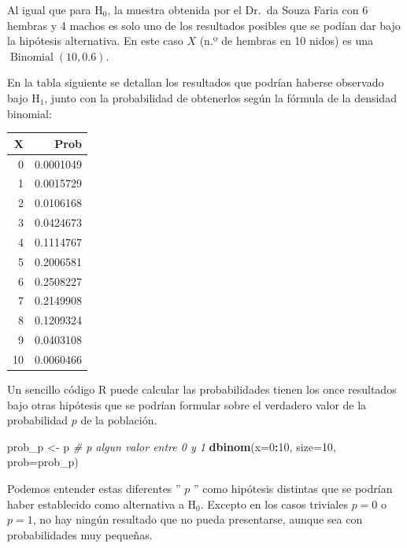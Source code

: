 \documentclass[
]{article}
\newenvironment{Shaded}{\begin{snugshade}}{\end{snugshade}}
\newcommand{\AttributeTok}[1]{\textcolor[rgb]{0.13,0.29,0.53}{#1}}
\newcommand{\CommentTok}[1]{\textcolor[rgb]{0.56,0.35,0.01}{\textit{#1}}}
\newcommand{\DecValTok}[1]{\textcolor[rgb]{0.00,0.00,0.81}{#1}}
\newcommand{\FunctionTok}[1]{\textcolor[rgb]{0.13,0.29,0.53}{\textbf{#1}}}
\newcommand{\NormalTok}[1]{#1}
\newcommand{\OtherTok}[1]{\textcolor[rgb]{0.56,0.35,0.01}{#1}}
\newcommand{\SpecialCharTok}[1]{\textcolor[rgb]{0.81,0.36,0.00}{\textbf{#1}}}
\begin{document}
Al igual que para \(\mathrm{H}_{0}\), la muestra obtenida por el Dr.~da Souza Faria con 6 hembras y 4 machos es solo uno de los resultados posibles que se podían dar bajo la hipótesis alternativa. En este caso \(X\) (n.º de hembras en 10 nidos) es una \(\operatorname{Binomial}(10,0.6)\).

En la tabla siguiente se detallan los resultados que podrían haberse observado bajo \(\mathrm{H}_{1}\), junto con la probabilidad de obtenerlos según la fórmula de la densidad binomial:

\begin{tabular}{r|r}
\hline
X & Prob\\
\hline
0 & 0.0001049\\
\hline
1 & 0.0015729\\
\hline
2 & 0.0106168\\
\hline
3 & 0.0424673\\
\hline
4 & 0.1114767\\
\hline
5 & 0.2006581\\
\hline
6 & 0.2508227\\
\hline
7 & 0.2149908\\
\hline
8 & 0.1209324\\
\hline
9 & 0.0403108\\
\hline
10 & 0.0060466\\
\hline
\end{tabular}

Un sencillo código R puede calcular las probabilidades tienen los once resultados bajo otras hipótesis que se podrían formular sobre el verdadero valor de la probabilidad \(p\) de la población.

\begin{Shaded}
\begin{Highlighting}[]
\NormalTok{prob\_p }\OtherTok{\textless{}{-}}\NormalTok{ p }\CommentTok{\# p algun valor entre 0 y 1}
\FunctionTok{dbinom}\NormalTok{(}\AttributeTok{x=}\DecValTok{0}\SpecialCharTok{:}\DecValTok{10}\NormalTok{, }\AttributeTok{size=}\DecValTok{10}\NormalTok{, }\AttributeTok{prob=}\NormalTok{prob\_p)}
\end{Highlighting}
\end{Shaded}

Podemos entender estas diferentes '' \(p\) '' como hipótesis distintas que se podrían haber establecido como alternativa a \(\mathrm{H}_{0}\). Excepto en los casos triviales \(p=0\) o \(p=1\), no hay ningún resultado que no pueda presentarse, aunque sea con probabilidades muy pequeñas.
\end{document}

